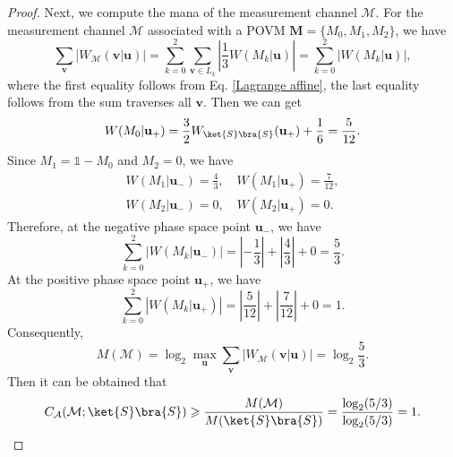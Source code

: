\documentclass[aps,pra,twocolumn,floatfix,amsfonts,10pt]{revtex4-2}
\begin{document}
\begin{proof}
	Next, we compute the mana of the measurement channel $\mathcal{M}$.
	For the measurement channel $\mathcal{M}$ associated with a POVM
	$\mathbf{M}=\{M_0,M_1,M_2\}$, we have
	\begin{equation}
			\sum_{\mathbf{v}} \left|W_{\mathcal{M}}(\mathbf{v}|\mathbf{u})\right|= \sum_{k=0}^{2} \sum_{\mathbf{v}\in L_k} \left| \frac{1}{3}W(M_k|\mathbf{u}) \right|= \sum_{k=0}^{2} \left|W(M_k|\mathbf{u})\right|,
	\end{equation}
	where the first equality follows from Eq. \eqref{Lagrange affine}, the last equality follows from the sum traverses all $\mathbf{v}$.
	Then we can get
	\begin{equation}
		W(M_0|\mathbf{u}_+) = \frac{3}{2}W_{\ket{S}\bra{S}} (\mathbf{u}_+)+\frac{1}{6} = \frac{5}{12}.
	\end{equation}
	Since $M_1=\mathds{1}-M_0$ and $M_2=0$, we have
	\begin{gather}
		W(M_1|\mathbf{u}_-) = \frac{4}{3}, \quad W(M_1|\mathbf{u}_+) = \frac{7}{12}, \\ 
		W(M_2|\mathbf{u}_-)=0, \quad W(M_2|\mathbf{u}_+)=0.
	\end{gather}
	Therefore, at the negative phase space point $\mathbf{u}_-$, we have
	\begin{equation}
		\sum_{k=0}^{2}\left|W(M_k|\mathbf{u}_-)\right| = \left|-\frac{1}{3}\right|+\left|\frac{4}{3}\right|+0=\frac{5}{3}.
	\end{equation}
	At the positive phase space point $\mathbf{u}_+$, we have
	\begin{equation}
		\sum_{k=0}^{2}\left|W(M_k|\mathbf{u}_+)\right| =
		\left|\frac{5}{12}\right|+\left|\frac{7}{12}\right|+0=1.
	\end{equation}
	Consequently,
	\begin{equation}
		M(\mathcal{M}) = \log_2\max_{\mathbf{u}}\sum_{\mathbf{v}} \left|W_{\mathcal{M}}(\mathbf{v}|\mathbf{u})\right| =  \log_2\frac{5}{3}.
	\end{equation}
	Then it can be obtained that
	\begin{equation}
		C_{\mathcal{A}}(\mathcal{M};\ket{S}\bra{S}) \geqslant \frac{M(\mathcal{M})}{M(\ket{S}\bra{S})} = \frac{\log_2(5/3)}{\log_2(5/3)} = 1.
	\end{equation}
	

\end{proof}
\end{document}
